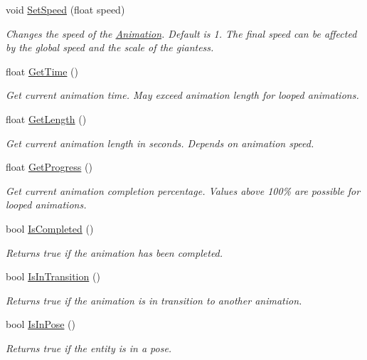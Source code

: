 \begin{DoxyCompactItemize}
void \mbox{\hyperlink{class_lua_1_1_animation_aefdc9f4c78bada7dacfdb39d07c4b576}{Set\+Speed}} (float speed)
\begin{DoxyCompactList}\small\item\em Changes the speed of the \mbox{\hyperlink{class_lua_1_1_animation}{Animation}}. Default is 1. The final speed can be affected by the global speed and the scale of the giantess. \end{DoxyCompactList}\item 
float \mbox{\hyperlink{class_lua_1_1_animation_ad7c23e47dae3b3c354d317724e93e887}{Get\+Time}} ()
\begin{DoxyCompactList}\small\item\em Get current animation time. May exceed animation length for looped animations. \end{DoxyCompactList}\item 
float \mbox{\hyperlink{class_lua_1_1_animation_a8da88aefb747e3128bcbf35be8451b21}{Get\+Length}} ()
\begin{DoxyCompactList}\small\item\em Get current animation length in seconds. Depends on animation speed. \end{DoxyCompactList}\item 
float \mbox{\hyperlink{class_lua_1_1_animation_ae9196e188d96824f23cf65b1f835aa1a}{Get\+Progress}} ()
\begin{DoxyCompactList}\small\item\em Get current animation completion percentage. Values above 100\% are possible for looped animations. \end{DoxyCompactList}\item 
bool \mbox{\hyperlink{class_lua_1_1_animation_afd07956e9f1dc6f551d8ca036493a646}{Is\+Completed}} ()
\begin{DoxyCompactList}\small\item\em Returns true if the animation has been completed. \end{DoxyCompactList}\item 
bool \mbox{\hyperlink{class_lua_1_1_animation_a6f6e8dabc438a05a0338f69a25a61d71}{Is\+In\+Transition}} ()
\begin{DoxyCompactList}\small\item\em Returns true if the animation is in transition to another animation. \end{DoxyCompactList}\item 
bool \mbox{\hyperlink{class_lua_1_1_animation_aede5bb0940e1daed76c816ba30dac6f2}{Is\+In\+Pose}} ()
\begin{DoxyCompactList}\small\item\em Returns true if the entity is in a pose. \end{DoxyCompactList}\end{DoxyCompactItemize}
